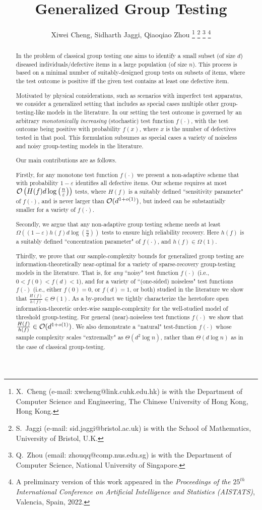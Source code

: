 \documentclass[onecolumn,letterpaper]{IEEEtran}
\title{{Generalized Group Testing}}
\author{Xiwei Cheng, Sidharth Jaggi, Qiaoqiao Zhou
\thanks{X.\ Cheng (e-mail: xwcheng@link.cuhk.edu.hk) is with the Department of Computer Science and Engineering, The Chinese University of Hong Kong, Hong Kong.}
\thanks{S.\ Jaggi (e-mail: sid.jaggi@bristol.ac.uk) is with the School of Mathematics, University of Bristol, U.K.}
 \thanks{Q.\ Zhou (email: zhouqq@comp.nus.edu.sg) is with the Department of Computer Science, National University of Singapore.}
\thanks{A preliminary version of this work appeared in the {\it Proceedings of the $25^{th}$ International Conference on Artificial Intelligence and Statistics (AISTATS)}, Valencia,
Spain, 2022.}}
\newcommand{\fh}{{h(f)}}
\newcommand{\fH}{{H(f)}}
\begin{document}
\maketitle


\begin{abstract}
In the problem of classical group testing one aims to identify a small subset (of size $d$) diseased individuals/defective items in a large population (of size $n$). This process is based on a minimal number of suitably-designed group tests on subsets of items, where the test outcome is positive iff the given test contains at least one defective item.

Motivated by physical considerations, such as scenarios with imperfect test apparatus, we consider a generalized setting that includes as special cases multiple other group-testing-like models in the literature. In our setting the test outcome is governed by an arbitrary {\it monotonically increasing} (stochastic) test function $f(\cdot)$, with the test outcome being positive with probability $f(x)$, where $x$ is the number of defectives tested in that pool. This formulation subsumes as special cases a variety of noiseless and noisy group-testing models in the literature.

Our main contributions are as follows.

Firstly, for any monotone test function $f(\cdot)$ we present a non-adaptive scheme  that with probability $1-\varepsilon$ identifies all defective items. Our scheme requires at most ${\cal O}\left( \fH d\log\left(\frac{n}{\varepsilon}\right)\right)$ tests, where $\fH$ is a suitably defined ``sensitivity parameter" of $f(\cdot)$, and is never larger than ${\cal O}(d^{1+o(1)})$, but indeed can be substantially smaller for a variety of $f(\cdot)$.

Secondly, we argue that any non-adaptive group testing scheme needs at least $\Omega \left((1-\varepsilon)\fh d\log\left(\frac n d\right)\right)$ tests to ensure high reliability recovery. Here $\fh$ is a suitably defined ``concentration parameter" of $f(\cdot)$, and $\fh \in  \Omega{(1)}$.

Thirdly, we prove that our sample-complexity bounds for generalized group testing are information-theoretically near-optimal for a variety of sparse-recovery group-testing models in the literature.
That is, for {\it any} ``noisy" test function $f(\cdot)$
(i.e., $0< f(0) < f(d) <1$), and for a variety of ``(one-sided) noiseless" test functions $f(\cdot)$ (i.e., either $f(0)=0$, or $f(d)=1$, or both) studied in the literature we show that $\frac {\fH} {\fh} \in \Theta(1)$.
As a by-product we tightly characterize the heretofore open information-theoretic order-wise sample-complexity for the well-studied model of threshold group-testing. For general (near)-noiseless test functions $f(\cdot)$ we show that $\frac {\fH} {\fh} \in {\cal O}(d^{1+o(1)})$.  We also demonstrate a ``natural" test-function $f(\cdot)$ whose sample complexity scales ``extremally" as $\Theta(d^2\log n )$, rather than $\Theta(d\log n)$ as in the case of classical group-testing.




\end{abstract}
\end{document}
